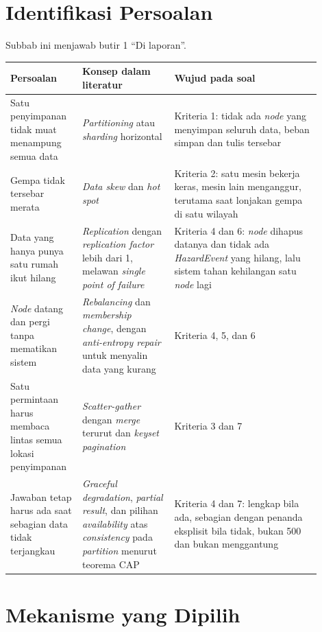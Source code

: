 \section{Identifikasi Persoalan}

Subbab ini menjawab butir 1 ``Di laporan''.

\begin{longtable}[]{|>{\raggedright\arraybackslash}p{0.2\linewidth}|>{\raggedright\arraybackslash}p{0.27\linewidth}|>{\raggedright\arraybackslash}p{0.43\linewidth}|}
\hline
\textbf{Persoalan} & \textbf{Konsep dalam literatur} & \textbf{Wujud pada soal} \\
\hline
\endhead
Satu penyimpanan tidak muat menampung semua data & \textit{Partitioning} atau \textit{sharding} horizontal & Kriteria 1: tidak ada \textit{node} yang menyimpan seluruh data, beban simpan dan tulis tersebar \\
\hline
Gempa tidak tersebar merata & \textit{Data skew} dan \textit{hot spot} & Kriteria 2: satu mesin bekerja keras, mesin lain menganggur, terutama saat lonjakan gempa di satu wilayah \\
\hline
Data yang hanya punya satu rumah ikut hilang & \textit{Replication} dengan \textit{replication factor} lebih dari 1, melawan \textit{single point of failure} & Kriteria 4 dan 6: \textit{node} dihapus datanya dan tidak ada \textit{HazardEvent} yang hilang, lalu sistem tahan kehilangan satu \textit{node} lagi \\
\hline
\textit{Node} datang dan pergi tanpa mematikan sistem & \textit{Rebalancing} dan \textit{membership change}, dengan \textit{anti-entropy repair} untuk menyalin data yang kurang & Kriteria 4, 5, dan 6 \\
\hline
Satu permintaan harus membaca lintas semua lokasi penyimpanan & \textit{Scatter-gather} dengan \textit{merge} terurut dan \textit{keyset pagination} & Kriteria 3 dan 7 \\
\hline
Jawaban tetap harus ada saat sebagian data tidak terjangkau & \textit{Graceful degradation}, \textit{partial result}, dan pilihan \textit{availability} atas \textit{consistency} pada \textit{partition} menurut teorema CAP & Kriteria 4 dan 7: lengkap bila ada, sebagian dengan penanda eksplisit bila tidak, bukan 500 dan bukan menggantung \\
\hline
\end{longtable}

\section{Mekanisme yang Dipilih}

